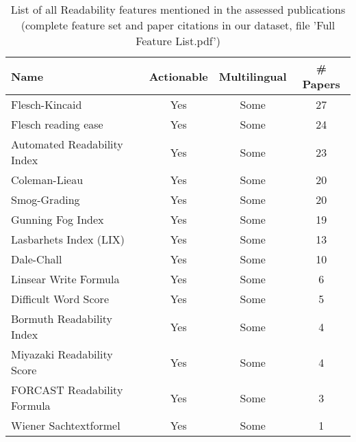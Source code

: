 \begin{table}[htbp]
    \caption{List of all Readability features mentioned in the assessed publications (complete feature set and paper citations in our dataset, file 'Full Feature List.pdf')}
    \label{tab:feat_Readability}
    \centering
    \begin{tabular}{m{} c c c}
        \toprule
        \textbf{Name} & \textbf{Actionable} & \textbf{Multilingual} & \textbf{\# Papers} \\ 
        \midrule
        Flesch-Kincaid & Yes & Some & 27 \\
        Flesch reading ease & Yes & Some & 24 \\
        Automated Readability Index & Yes & Some & 23 \\
        Coleman-Lieau & Yes & Some & 20 \\
        Smog-Grading & Yes & Some & 20 \\
        Gunning Fog Index & Yes & Some & 19 \\
        Lasbarhets Index (LIX) & Yes & Some & 13 \\
        Dale-Chall & Yes & Some & 10 \\
        Linsear Write Formula & Yes & Some & 6 \\
        Difficult Word Score & Yes & Some & 5 \\
        Bormuth Readability Index & Yes & Some & 4 \\
        Miyazaki Readability Score & Yes & Some & 4 \\
        FORCAST Readability Formula & Yes & Some & 3 \\
        Wiener Sachtextformel & Yes & Some & 1 \\
        \bottomrule
    \end{tabular}
\end{table}